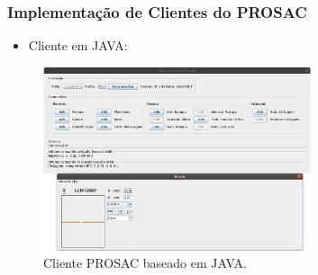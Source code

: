 \documentclass{beamer}
\begin{document}
\begin{frame}
\frametitle {Implementação de Clientes do PROSAC}

\begin{itemize}
  \item Cliente em JAVA:	 
\end{itemize}

\begin{figure}
\centering
\includegraphics[width=0.7\textwidth]{image/prosac-java}
\caption {Cliente PROSAC baseado em JAVA.}
\label{fig:login}
\end{figure}
 
\end{frame}
\end{document}
